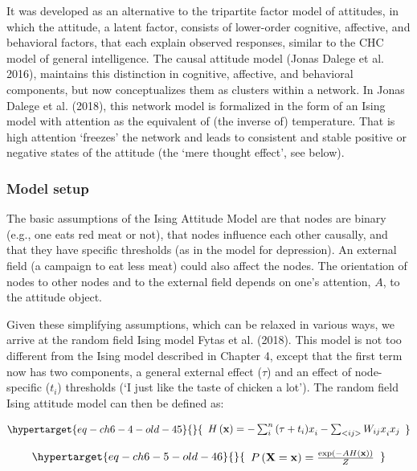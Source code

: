 \documentclass[
  letterpaper,
]{scrbook}
\begin{document}
It was developed as an alternative to the tripartite factor model of
attitudes, in which the attitude, a latent factor, consists of
lower-order cognitive, affective, and behavioral factors, that each
explain observed responses, similar to the CHC model of general
intelligence. The causal attitude model (Jonas Dalege et al. 2016),
maintains this distinction in cognitive, affective, and behavioral
components, but now conceptualizes them as clusters within a network. In
Jonas Dalege et al. (2018), this network model is formalized in the form
of an Ising model with attention as the equivalent of (the inverse of)
temperature. That is high attention `freezes' the network and leads to
consistent and stable positive or negative states of the attitude (the
`mere thought effect', see below).

\hypertarget{model-setup}{%
\subsubsection{Model setup}\label{model-setup}}

The basic assumptions of the Ising Attitude Model are that nodes are
binary (e.g., one eats red meat or not), that nodes influence each other
causally, and that they have specific thresholds (as in the model for
depression). An external field (a campaign to eat less meat) could also
affect the nodes. The orientation of nodes to other nodes and to the
external field depends on one's attention, \(A\), to the attitude
object.

Given these simplifying assumptions, which can be relaxed in various
ways, we arrive at the random field Ising model Fytas et al. (2018).
This model is not too different from the Ising model described in
Chapter 4, except that the first term now has two components, a general
external effect (\(\tau\)) and an effect of node-specific (\(t_{i}\))
thresholds (`I just like the taste of chicken a lot'). The random field
Ising attitude model can then be defined as:

\begin{equation}\protect\hypertarget{eq-ch6-4-old-45}{}{\begin{array}{r}
H\left( \mathbf{x} \right) = - \sum_{i}^{n}{(\tau + {t_{i})x}_{i}} - \sum_{< ij >}^{}{{W_{ij}x}_{i}x_{j}}
\end{array}}\label{eq-ch6-4-old-45}\end{equation}

\begin{equation}\protect\hypertarget{eq-ch6-5-old-46}{}{\begin{array}{r}
P\left( \mathbf{X} = \mathbf{x} \right) = \frac{\exp\left( - AH\left( \mathbf{x} \right) \right)}{Z}
\end{array}}\label{eq-ch6-5-old-46}\end{equation}
\end{document}
